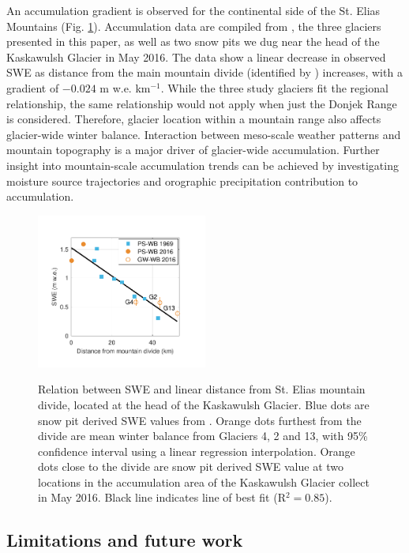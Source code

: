 \documentclass[twocolumn, letterpaper]{igs}
\begin{document}
An accumulation gradient is observed for the continental side of the St. Elias Mountains (Fig. \ref{fig:AccumGrad}). Accumulation data are compiled from \cite{Taylor1969}, the three glaciers presented in this paper, as well as two snow pits we dug near the head of the Kaskawulsh Glacier in May 2016. The data show a linear decrease in observed SWE as distance from the main mountain divide (identified by \cite{Taylor1969}) increases, with a gradient of $-0.024$ m w.e. km$^{-1}$. While the three study glaciers fit the regional relationship, the same relationship would not apply when just the Donjek Range is considered. Therefore, glacier location within a mountain range also affects glacier-wide winter balance. Interaction between meso-scale weather patterns and mountain topography is a major driver of glacier-wide accumulation. Further insight into mountain-scale accumulation trends can be achieved by investigating moisture source trajectories and orographic precipitation contribution to accumulation. 

\begin{figure}
	\centering
	\includegraphics[width =0.5\textwidth]{AccumGrad.pdf}\\
	\caption{Relation between SWE and linear distance from St. Elias mountain divide, located at the head of the Kaskawulsh Glacier. Blue dots are snow pit derived SWE values from \cite{Taylor1969}. Orange dots furthest from the divide are mean winter balance from Glaciers 4, 2 and 13, with 95\% confidence interval using a linear regression interpolation. Orange dots close to the divide are snow pit derived SWE value at two locations in the accumulation area of the Kaskawulsh Glacier collect in May 2016. Black line indicates line of best fit (R$^2=0.85$).}
	\label{fig:AccumGrad}
\end{figure}


\subsection{Limitations and future work}
\end{document}
